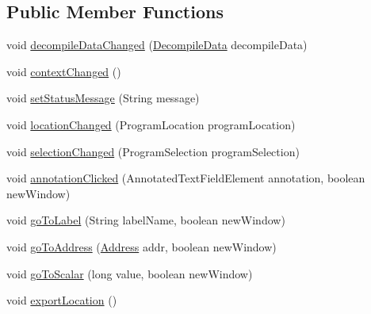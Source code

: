 \subsection*{Public Member Functions}
\begin{DoxyCompactItemize}
\item 
void \mbox{\hyperlink{interfaceghidra_1_1app_1_1decompiler_1_1component_1_1_decompiler_callback_handler_a317fd8c2d45cf2bef9ab0e15f4f7ed30}{decompile\+Data\+Changed}} (\mbox{\hyperlink{classghidra_1_1app_1_1decompiler_1_1component_1_1_decompile_data}{Decompile\+Data}} decompile\+Data)
\item 
void \mbox{\hyperlink{interfaceghidra_1_1app_1_1decompiler_1_1component_1_1_decompiler_callback_handler_ae908ba10bddcb8d863eae48d8f1887a0}{context\+Changed}} ()
\item 
void \mbox{\hyperlink{interfaceghidra_1_1app_1_1decompiler_1_1component_1_1_decompiler_callback_handler_af7aab35a0989733d8f7731a18aa4ea52}{set\+Status\+Message}} (String message)
\item 
void \mbox{\hyperlink{interfaceghidra_1_1app_1_1decompiler_1_1component_1_1_decompiler_callback_handler_aca06fb5e7e930f4b89195dbdf60d95c3}{location\+Changed}} (Program\+Location program\+Location)
\item 
void \mbox{\hyperlink{interfaceghidra_1_1app_1_1decompiler_1_1component_1_1_decompiler_callback_handler_a9dc1e47dfe1bdecaa25b5db9d06cd1d7}{selection\+Changed}} (Program\+Selection program\+Selection)
\item 
void \mbox{\hyperlink{interfaceghidra_1_1app_1_1decompiler_1_1component_1_1_decompiler_callback_handler_a9b7c60460fed31e218b66a0493b43826}{annotation\+Clicked}} (Annotated\+Text\+Field\+Element annotation, boolean new\+Window)
\item 
void \mbox{\hyperlink{interfaceghidra_1_1app_1_1decompiler_1_1component_1_1_decompiler_callback_handler_ac730fdb08d3f3ac4454d34b42cfe3d2b}{go\+To\+Label}} (String label\+Name, boolean new\+Window)
\item 
void \mbox{\hyperlink{interfaceghidra_1_1app_1_1decompiler_1_1component_1_1_decompiler_callback_handler_a83ea9c0c73ddd58a0d44de4490752a6c}{go\+To\+Address}} (\mbox{\hyperlink{class_address}{Address}} addr, boolean new\+Window)
\item 
void \mbox{\hyperlink{interfaceghidra_1_1app_1_1decompiler_1_1component_1_1_decompiler_callback_handler_a32303b61cd68fd57ce7e33a2973f9372}{go\+To\+Scalar}} (long value, boolean new\+Window)
\item 
void \mbox{\hyperlink{interfaceghidra_1_1app_1_1decompiler_1_1component_1_1_decompiler_callback_handler_a94124bad6258c05b2de2fd1e9c7069b1}{export\+Location}} ()
\end{DoxyCompactItemize}


